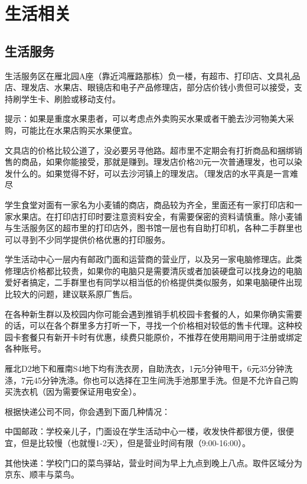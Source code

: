 \section{生活相关}

\subsection{生活服务}


生活服务区在雁北园A座（靠近鸿雁路那栋）负一楼，有超市、打印店、文具礼品店、理发店、水果店、眼镜店和电子产品修理店，部分店价钱小贵但可以接受，支持刷学生卡、刷脸或移动支付。

提示：如果是重度水果患者，可以考虑点外卖购买水果或者干脆去沙河物美大采购，可能比在水果店购买水果便宜。

文具店的价格比较公道了，没必要另寻他路。超市里不定期会有打折商品和捆绑销售的商品，如果你能接受，那就是赚到。理发店价格20元一次普通理发，也可以染发什么的。如果觉得不好，可以去沙河镇上的理发店。（理发店的水平真是一言难尽

学生食堂对面有一家名为小麦铺的商店，商品较为齐全，里面还有一家打印店和一家水果店。在打印店打印时要注意资料安全，有需要保密的资料请慎重。除小麦铺与生活服务区的超市里的打印店外，图书馆一层也有自助打印机，各种二手群里也可以寻到不少同学提供价格优惠的打印服务。

学生活动中心一层内有邮政门面和运营商的营业厅，以及另一家电脑修理店。此类修理店价格都比较贵，如果你的电脑只是需要清灰或者加装硬盘可以找身边的电脑爱好者搞定，二手群里也有同学以相当低的价格提供类似服务，如果电脑硬件出现比较大的问题，建议联系原厂售后。

在各种新生群以及校园内你可能会遇到推销手机校园卡套餐的人，如果你确实需要的话，可以在各个群里多方打听一下，寻找一个价格相对较低的售卡代理。这种校园卡套餐只有新开卡时有优惠，续费只能原价，不推荐在使用期间用于注册或绑定各种账号。


雁北D2地下和雁南S4地下均有洗衣房，自助洗衣，1元5分钟甩干，6元35分钟洗涤，7元45分钟洗涤。你也可以选择在卫生间洗手池那里手洗。但是不允许自己购买洗衣机（因为需要保证用电安全）。


根据快递公司不同，你会遇到下面几种情况：

中国邮政：学校亲儿子，门面设在学生活动中心一楼，收发快件都很方便，很便宜，但是比较慢（也就慢1-2天），但是营业时间有限（9:00-16:00）。

其他快递：学校门口的菜鸟驿站，营业时间为早上九点到晚上八点。取件区域分为京东、顺丰与菜鸟。

